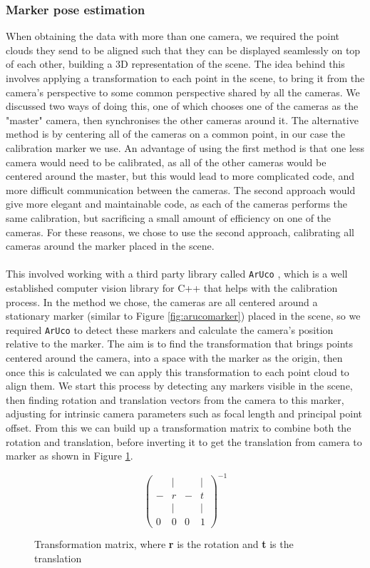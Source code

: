 \documentclass{article}
\begin{document}
\subsubsection{Marker pose estimation}
When obtaining the data with more than one camera, we required the point clouds they send to be aligned such that they can be displayed seamlessly on top of each other, building a 3D representation of the scene. The idea behind this involves applying a transformation to each point in the scene, to bring it from the camera's perspective to some common perspective shared by all the cameras. We discussed two ways of doing this, one of which chooses one of the cameras as the "master" camera, then synchronises the other cameras around it. The alternative method is by centering all of the cameras on a common point, in our case the calibration marker we use. An advantage of using the first method is that one less camera would need to be calibrated, as all of the other cameras would be centered around the master, but this would lead to more complicated code, and more difficult communication between the cameras. The second approach would give more elegant and maintainable code, as each of the cameras performs the same calibration, but sacrificing a small amount of efficiency on one of the cameras. For these reasons, we chose to use the second approach, calibrating all cameras around the marker placed in the scene. 
\\\\
This involved working with a third party library called \texttt{ArUco} \cite{aruco}, which is a well established computer vision library for C++ that helps with the calibration process. In the method we chose, the cameras are all centered around a stationary marker (similar to Figure \ref{fig:arucomarker}) placed in the scene, so we required \texttt{ArUco} \cite{aruco} to detect these markers and calculate the camera's position relative to the marker. The aim is to find the transformation that brings points centered around the camera, into a space with the marker as the origin, then once this is calculated we can apply this transformation to each point cloud to align them. We start this process by detecting any markers visible in the scene, then finding rotation and translation vectors from the camera to this marker, adjusting for intrinsic camera parameters such as focal length and principal point offset. From this we can build up a transformation matrix to combine both the rotation and translation, before inverting it to get the translation from camera to marker as shown in Figure \ref{fig:transformationMatrix}. \\
\begin{figure}[h]
  \[\left(\begin{array}{cccc}
      & | &   & | \\
    - & r & - & t \\ 
      & | &   & | \\
    0 & 0 & 0 & 1
    \end{array}\right)^{-1}\]
  \caption{Transformation matrix, where \textbf{r} is the rotation and \textbf{t} is the translation}
  \label{fig:transformationMatrix}
\end{figure}
\end{document}
